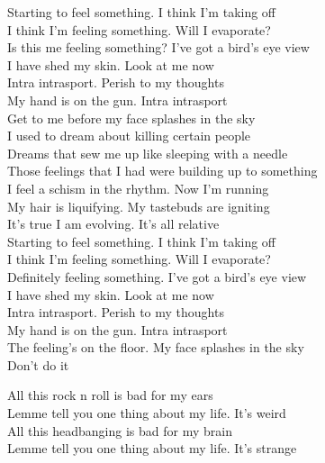 Starting to feel something. I think I'm taking off \\
I think I'm feeling something. Will I evaporate? \\
Is this me feeling something? I've got a bird's eye view \\
I have shed my skin. Look at me now \\

Intra intrasport. Perish to my thoughts \\
My hand is on the gun. Intra intrasport \\
Get to me before my face splashes in the sky \\

I used to dream about killing certain people \\
Dreams that sew me up like sleeping with a needle \\
Those feelings that I had were building up to something \\
I feel a schism in the rhythm. Now I'm running \\

My hair is liquifying. My tastebuds are igniting \\
It's true I am evolving. It's all relative \\

Starting to feel something. I think I'm taking off \\
I think I'm feeling something. Will I evaporate? \\
Definitely feeling something. I've got a bird's eye view \\
I have shed my skin. Look at me now \\

Intra intrasport. Perish to my thoughts \\
My hand is on the gun. Intra intrasport \\
The feeling's on the floor. My face splashes in the sky \\

Don't do it \\




All this rock n roll is bad for my ears \\
Lemme tell you one thing about my life. It's weird \\
All this headbanging is bad for my brain \\
Lemme tell you one thing about my life. It's strange \\

